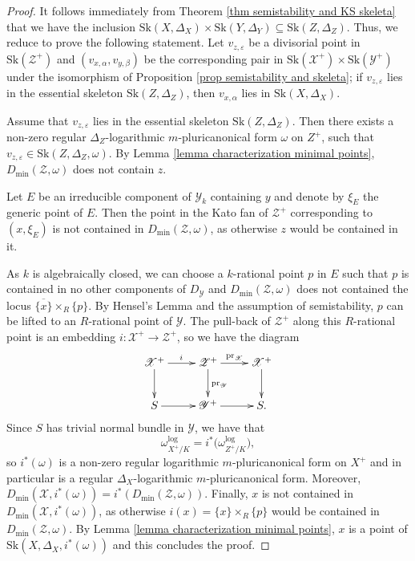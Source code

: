 \documentclass{amsart}%
\numberwithin{equation}{subsection}
\theoremstyle{plain2}
\theoremstyle{definition2}
\theoremstyle{stepstyle}
\theoremstyle{point}
\theoremstyle{subpoint}
\newcommand{\cX}{\ensuremath{\mathscr{X}}}
\newcommand{\cY}{\ensuremath{\mathscr{Y}}}
\newcommand{\cZ}{\ensuremath{\mathscr{Z}}}
\renewcommand{\cY}{\ensuremath{\mathscr{Y}}}
\newcommand{\pr}{\mathrm{pr}}
\newcommand{\Sk}{\mathrm{Sk}}
\begin{document}
\begin{proof}
It follows immediately from Theorem \ref{thm semistability and KS skeleta} that we have the inclusion $ \Sk(X,\Delta_X) \times \Sk(Y,\Delta_Y) \subseteq \Sk(Z,\Delta_Z)$. Thus, we reduce to prove the following statement. Let $v_{z,\varepsilon}$ be a divisorial point in $\Sk(\cZ^+)$ and $(v_{x,\alpha},v_{y,\beta})$ be the corresponding pair in $\Sk(\cX^+) \times \Sk(\cY^+)$ under the isomorphism of Proposition \ref{prop semistability and skeleta}; if $v_{z,\varepsilon}$ lies in the essential skeleton $\Sk(Z,\Delta_Z)$, then $v_{x,\alpha}$ lies in $\Sk(X,\Delta_X)$.

Assume that $v_{z,\varepsilon}$ lies in the essential skeleton $\Sk(Z,\Delta_Z)$. Then there exists a non-zero regular $\Delta_Z$-logarithmic $m$-pluricanonical form $\omega$ on $Z^+$, such that $v_{z,\varepsilon} \in \Sk(Z,\Delta_Z, \omega)$. By Lemma \ref{lemma characterization minimal points}, $D_{\min}(\cZ,\omega)$ does not contain $z$.

Let $E$ be an irreducible component of $\cY_k$ containing $y$ and denote by $\xi_E$ the generic point of $E$. Then the point in the Kato fan of $\cZ^+$ corresponding to $(x,\xi_E)$ is not contained in $D_{\min}(\cZ,\omega)$, as otherwise $z$ would be contained in it.

As $k$ is algebraically closed, we can choose a $k$-rational point $p$ in $E$ such that $p$ is contained in no other components of $D_\cY$ and $D_{\min}(\cZ,\omega)$ does not contained the locus $\overline{\{x\}} \times_R \{p\}$. By Hensel's Lemma and the assumption of semistability, $p$ can be lifted to an $R$-rational point of $\cY$. The pull-back of $\cZ^+$ along this $R$-rational point is an embedding $i: \cX^+ \rightarrow \cZ^+$, so we have the diagram
\[
\xymatrix{ \cX^+ \ar[r]^i\ar[d] & \cZ^+ \ar[r]^{\pr_\cX}\ar[d]^{\pr_\cY} & \cX^+ \ar[d] \\
S \ar[r] & \cY^+\ar[r] & S.
}
\] Since $S$ has trivial normal bundle in $\cY$, we  have that $$\omega_{X^+/K}^{\log} = i^*\big(\omega_{Z^+/K}^{\log}\big),$$ so $i^*(\omega)$ is a non-zero regular logarithmic $m$-pluricanonical form on $X^+$ and in particular is a regular $\Delta_X$-logarithmic $m$-pluricanonical form. Moreover, $D_{\min}(\cX,i^*(\omega)) = i^*(D_{\min}(\cZ,\omega))$. Finally, $x$ is not contained in $D_{\min}(\cX, i^*(\omega))$, as otherwise $i(x)= \{x\} \times_R \{p\}$ would be contained in $D_{\min}(\cZ,\omega)$. By Lemma \ref{lemma characterization minimal points}, $x$ is a point of $\Sk(X,\Delta_X, i^*(\omega))$ and this concludes the proof.
\end{proof}
\end{document}

